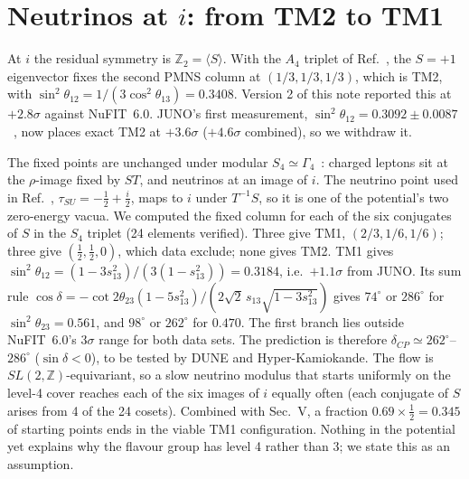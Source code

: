 \documentclass[aps,prd,twocolumn,superscriptaddress,nofootinbib,showkeys]{revtex4-2}
\begin{document}
\section{Neutrinos at $i$: from TM2 to TM1}
At $i$ the residual symmetry is $\mathbb Z_2=\langle S\rangle$. With the $A_4$ triplet of Ref.~\cite{F17}, the $S=+1$ eigenvector fixes the second PMNS column at $(1/3,1/3,1/3)$, which is TM2, with $\sin^2\theta_{12}=1/(3\cos^2\theta_{13})=0.3408$. Version 2 of this note reported this at $+2.8\sigma$ against NuFIT~6.0. JUNO's first measurement, $\sin^2\theta_{12}=0.3092\pm0.0087$~\cite{JUNO}, now places exact TM2 at $+3.6\sigma$ ($+4.6\sigma$ combined), so we withdraw it.

The fixed points are unchanged under modular $S_4\simeq\Gamma_4$~\cite{TM1,NPP4}: charged leptons sit at the $\rho$-image fixed by $ST$, and neutrinos at an image of $i$. The neutrino point used in Ref.~\cite{TM1}, $\tau_{SU}=-\tfrac12+\tfrac i2$, maps to $i$ under $T^{-1}S$, so it is one of the potential's two zero-energy vacua. We computed the fixed column for each of the six conjugates of $S$ in the $S_4$ triplet (24 elements verified). Three give TM1, $(2/3,1/6,1/6)$; three give $(\tfrac12,\tfrac12,0)$, which data exclude; none gives TM2. TM1 gives $\sin^2\theta_{12}=(1-3s_{13}^2)/(3(1-s_{13}^2))=0.3184$, i.e.\ $+1.1\sigma$ from JUNO. Its sum rule $\cos\delta=-\cot2\theta_{23}(1-5s_{13}^2)/(2\sqrt2\,s_{13}\sqrt{1-3s_{13}^2})$ gives $74^\circ$ or $286^\circ$ for $\sin^2\theta_{23}=0.561$, and $98^\circ$ or $262^\circ$ for $0.470$. The first branch lies outside NuFIT~6.0's $3\sigma$ range for both data sets. The prediction is therefore $\delta_{CP}\simeq262^\circ$--$286^\circ$ ($\sin\delta<0$), to be tested by DUNE and Hyper-Kamiokande. The flow is $SL(2,\mathbb Z)$-equivariant, so a slow neutrino modulus that starts uniformly on the level-4 cover reaches each of the six images of $i$ equally often (each conjugate of $S$ arises from 4 of the 24 cosets). Combined with Sec.~V, a fraction $0.69\times\tfrac12=0.345$ of starting points ends in the viable TM1 configuration. Nothing in the potential yet explains why the flavour group has level 4 rather than 3; we state this as an assumption.
\end{document}
